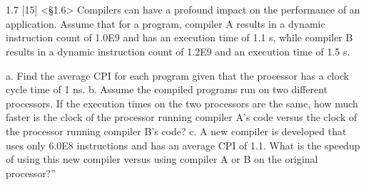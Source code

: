 \documentclass[paper=a4, fontsize=11pt]{scrartcl} %
\begin{document}
\pagebreak

\section{}

\begin{fancyquotes}
  1.7 [15] <§1.6> Compilers can have a profound impact on the
  performance of an application. Assume that for a program, compiler A
  results in a dynamic instruction count of 1.0E9 and has an execution
  time of 1.1 s, while compiler B results in a dynamic instruction
  count of 1.2E9 and an execution time of 1.5 s.

  a. Find the average CPI for each program given that the processor
  has a clock cycle time of 1 ns.
  b. Assume the compiled programs run on two different processors. If
  the execution times on the two processors are the same, how much
  faster is the clock of the processor running compiler A’s code
  versus the clock of the processor running compiler B’s code?
  c. A new compiler is developed that uses only 6.0E8 instructions and
  has an average CPI of 1.1. What is the speedup of using this new
  compiler versus using compiler A or B on the original processor?”
\end{fancyquotes}
\end{document}
